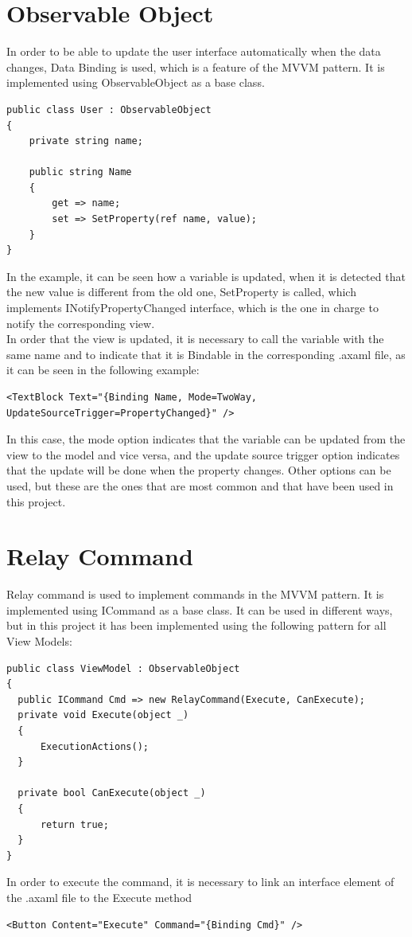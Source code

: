 \begin{appendices}
\section{Observable Object}\label{ap:observable_object}
{In order to be able to update the user interface automatically when the data changes, Data Binding is used, which is a feature of the MVVM pattern. It is implemented using ObservableObject as a base class. }
\begin{lstlisting}
public class User : ObservableObject
{
    private string name;

    public string Name
    {
        get => name;
        set => SetProperty(ref name, value);
    }
}
\end{lstlisting}
{
In the example, it can be seen how a variable is updated, when it is detected that the new value is different from the old one, SetProperty is called, which implements INotifyPropertyChanged interface, which is the one in charge to notify the corresponding view. \smallskip\\
In order that the view is updated, it is necessary to call the variable with the same name and to indicate that it is Bindable in the corresponding .axaml file, as it can be seen in the following example:}
\begin{lstlisting}
<TextBlock Text="{Binding Name, Mode=TwoWay, UpdateSourceTrigger=PropertyChanged}" />
\end{lstlisting}
{
In this case, the mode option indicates that the variable can be updated from the view to the model and vice versa, and the update source trigger option indicates that the update will be done when the property changes. Other options can be used, but these are the ones that are most common and that have been used in this project.
}

\clearpage
\section{Relay Command}\label{ap:relay_command}
{Relay command is used to implement commands in the MVVM pattern. It is implemented using ICommand as a base class. It can be used in different ways, but in this project it has been implemented using the following pattern for all View Models:}
\begin{lstlisting}
public class ViewModel : ObservableObject
{
  public ICommand Cmd => new RelayCommand(Execute, CanExecute);
  private void Execute(object _)
  {
      ExecutionActions();
  }

  private bool CanExecute(object _)
  {
      return true;
  }
}
\end{lstlisting}
{In order to execute the command, it is necessary to link an interface element of the .axaml file to the Execute method}
\begin{lstlisting}
<Button Content="Execute" Command="{Binding Cmd}" />
\end{lstlisting}


\end{appendices}

